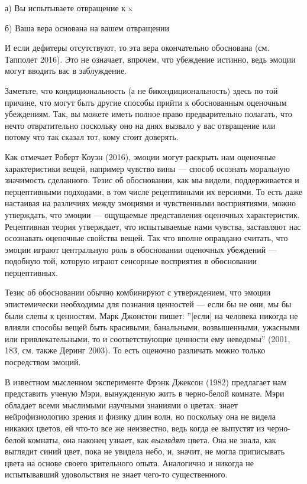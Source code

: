 \documentclass[11pt]{book}
\begin{document}
а) Вы испытываете отвращение к x

б) Ваша вера основана на вашем отвращении

И если дефитеры отсутствуют, то эта вера окончательно обоснована (см. Тапполет 2016). Это не означает, впрочем, что убеждение истинно, ведь эмоции могут вводить вас в заблуждение.

Заметьте, что кондициональность (а не бикондициональность) здесь по той причине, что могут быть другие способы прийти к обоснованным оценочным убеждениям. Так, вы можете иметь полное право предварительно полагать, что нечто отвратительно поскольку оно на днях вызвало у вас отвращение или потому что так сказал тот, кому стоит доверять.

Как отмечает Роберт Коуэн (2016), эмоции могут раскрыть нам оценочные характеристики вещей, например чувство вины --- способ осознать моральную значимость сделанного. Тезис об обосновании, как мы видели, поддерживается и перцептивными подходами, в том числе рецептивными их версиями. То есть даже настаивая на различиях между эмоциями и чувственными восприятиями, можно утверждать, что эмоции --- ощущаемые представления оценочных характеристик. Рецептивная теория утверждает, что испытываемые нами чувства, заставляют нас осознавать оценочные свойства вещей. Так что вполне оправдано считать, что эмоции играют центральную роль в обосновании оценочных убеждений --- подобную той, которую играют сенсорные восприятия в обосновании перцептивных.

Тезис об обосновании обычно комбинируют с утверждением, что эмоции эпистемически необходимы для познания ценностей --- если бы не они, мы бы были слепы к ценностям. Марк Джонстон пишет: ''[если] на человека никогда не влияли способы вещей быть красивыми, банальными, возвышенными, ужасными или привлекательными, то и соответствующие ценности ему неведомы'' (2001, 183, см. также Деринг 2003). То есть оценочно различать можно только посредством эмоций.

В известном мысленном эксперименте Фрэнк Джексон (1982) предлагает нам представить ученую Мэри, вынужденную жить в черно-белой комнате. Мэри обладает всеми мыслимыми научными знаниями о цветах: знает нейрофизиологию зрения и физику длин волн, но поскольку она не видела никаких цветов, ей что-то все же неизвестно, ведь когда ее выпустят из черно-белой комнаты, она наконец узнает, как \textit{выглядят} цвета. Она не знала, как выглядит синий цвет, пока не увидела небо, и, значит, не могла приписывать цвета на основе своего зрительного опыта. Аналогично и никогда не испытывавший удовольствия не знает чего-то существенного.
\end{document}

